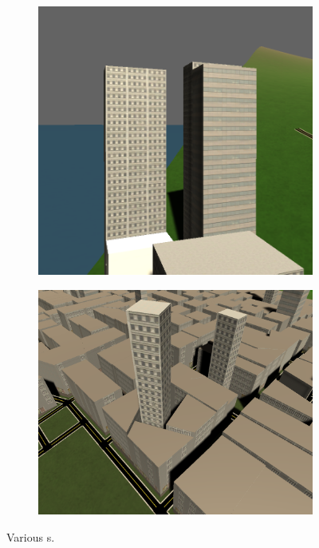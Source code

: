   \begin{figure}[H]
    \centering
  
    \begin{subfigure}[b]{0.45\textwidth}
      \includegraphics[width=\textwidth]{figure/skyscraper-close-up.PNG}
    \end{subfigure}
    \quad
    \begin{subfigure}[b]{0.45\textwidth}
      \includegraphics[width=\textwidth]{figure/wack.PNG}
    \end{subfigure}
    
    \caption{Various s.}
    \label{fig:skyscraper-result}
  \end{figure}
 